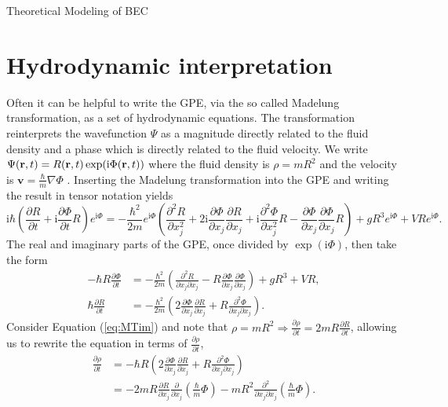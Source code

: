 \begin{chapter}{\label{cha:theoretical_model}Theoretical Modeling of BEC}
\section{\label{section:hydrodynamic} Hydrodynamic interpretation}
	Often it can be helpful to write the GPE, via the so called Madelung transformation, as a set of hydrodynamic equations. The transformation reinterprets the wavefunction $\Psi$ as a magnitude directly related to the fluid density and a phase which is directly related to the fluid velocity. We write $\Psi({\bf r},t) = R({\bf r},t)\exp (\mathrm{i}\Phi({\bf r},t))$ where the fluid density is $\rho=mR^2$ and the velocity is $\mathbf{v} = \frac{\hbar}{m}\nabla\Phi$ .
	Inserting the Madelung transformation into the GPE and writing the result in tensor notation yields
	\begin{equation*}
		\mathrm{i}\hbar\left( \frac{\partial R}{\partial t} + \mathrm{i}\frac{\partial \Phi}{\partial t} R \right)e^{\mathrm{i}\Phi} =
		-\frac{\hbar^2}{2m}e^{\mathrm{i}\Phi}\left( \frac{\partial^2 R}{\partial x_j^2} + 2\mathrm{i}\frac{\partial \Phi}{\partial x_j}\frac{\partial R}{\partial x_j}+
		\mathrm{i}\frac{\partial^2 \Phi}{\partial x_j^2}R -  \frac{\partial \Phi}{\partial x_j}\frac{\partial \Phi}{\partial x_j} R  \right) + gR^3e^{\mathrm{i}\Phi} + VRe^{\mathrm{i}\Phi}.
	\end{equation*}
	The real and imaginary parts of the GPE, once divided by $\exp (\mathrm{i}\Phi)$, then take the form
	\begin{align}
		-\hbar R \frac{\partial \Phi}{\partial t} &= -\frac{\hbar^2}{2m}\left( \frac{\partial^2 R}{\partial x_j \partial x_j} - R \frac{\partial \Phi}{\partial x_j}\frac{\partial \Phi}{\partial x_j}  \right) + gR^3 + VR, \label{eq:MTre}\\
		\hbar \frac{\partial R}{\partial t} &= -\frac{\hbar^2}{2m}\left( 2\frac{\partial \Phi}{\partial x_j}\frac{\partial R}{\partial x_j} + R \frac{\partial^2 \Phi}{\partial x_j \partial x_j} \right).
		\label{eq:MTim}
	\end{align}
	Consider Equation (\ref{eq:MTim}) and note that $\rho = mR^2 \Rightarrow \frac{\partial \rho}{\partial t} = 2mR\frac{\partial R}{\partial t}$, allowing us to rewrite the equation in terms of $\frac{\partial \rho}{\partial t}$,
	\begin{align*}
		\frac{\partial \rho}{\partial t} &= -\hbar R\left( 2 \frac{\partial \Phi}{\partial x_j} \frac{\partial R}{\partial x_j} + R \frac{\partial^2 \Phi}{\partial x_j\partial x_j} \right)\\
		&= -2mR\frac{\partial R}{\partial x_j}\frac{\partial}{\partial x_j}\left( \frac{\hbar}{m} \Phi \right) - mR^2 \frac{\partial^2}{\partial x_j \partial x_j}\left(\frac{\hbar}{m}\Phi \right).

\end{align*}
\end{chapter}
